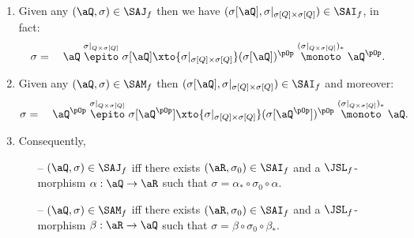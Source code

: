 \documentclass{article}
\begin{document}
\begin{lemma}
\label{lem:saj_sam_f_as_sai_extensions}
\item
\begin{enumerate}
\item
Given any $(\aQ,\sigma) \in \SAJ_f$ then we have $(\sigma[\aQ],\sigma |_{\sigma[Q] \times \sigma[Q]}) \in \SAI_f$, in fact:
\[
\sigma = \quad
\aQ \stackrel{\sigma|_{Q \times \sigma[Q]}}{\epito} \sigma[\aQ] \xto{\sigma |_{\sigma[Q] \times \sigma[Q]} } (\sigma[\aQ])^{\pOp} \stackrel{(\sigma|_{Q \times \sigma[Q]})_*}{\monoto} \aQ^{\pOp}.
\]

\item
Given any $(\aQ,\sigma) \in \SAM_f$ then $(\sigma[\aQ],\sigma |_{\sigma[Q] \times \sigma[Q]}) \in \SAI_f$ and moreover:
\[
\sigma = \quad
\aQ^{\pOp} \stackrel{\sigma|_{Q \times \sigma[Q]}}{\epito} \sigma[\aQ^{\pOp}] \xto{\sigma |_{\sigma[Q] \times \sigma[Q]} } (\sigma[\aQ^{\pOp}])^{\pOp} \stackrel{(\sigma|_{Q \times \sigma[Q]})_*}{\monoto} \aQ.
\]

\item
Consequently,
\begin{itemize}
\item[--]
$(\aQ,\sigma) \in \SAJ_f$ iff there exists $(\aR,\sigma_0) \in \SAI_f$ and a $\JSL_f$-morphism $\alpha : \aQ \to \aR$ such that $\sigma = \alpha_* \circ \sigma_0 \circ \alpha$.

\item[--]
$(\aQ,\sigma) \in \SAM_f$ iff there exists $(\aR,\sigma_0) \in \SAI_f$ and a $\JSL_f$-morphism $\beta : \aR \to \aQ$ such that $\sigma = \beta \circ \sigma_0 \circ \beta_*$.
\end{itemize}

\end{enumerate}
\end{lemma}
\end{document}
